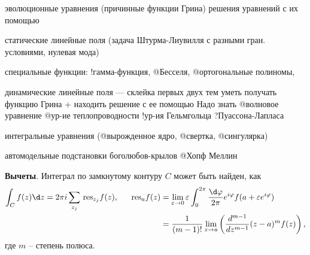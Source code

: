 эволюционные уравнения (причинные функции Грина)
решения уравнений с их помощью

статические линейные поля (задача Штурма-Лиувилля с разными гран. условиями, нулевая мода)

специальные функции: 
	!гамма-функция, 
	@Бесселя, 
	@ортогональные полиномы, 



динамические линейные поля — склейка первых двух тем 
	уметь получать функцию Грина 
	+ находить решение с ее помощью
	Надо знать 
		@волновое уравнение
		@ур-ие теплопроводности
		!ур-ия Гельмгольца
		?Пуассона-Лапласа

интегральные уравнения (@вырожденное ядро, @свертка, @сингулярка)

	автомодельные подстановки
	боголюбов-крылов
	@Хопф
	Меллин


\textbf{Вычеты}. Интеграл по замкнутому контуру $C$ может быть найден, как
\begin{align*}
    \int_C f(z) \d z = 2 \pi i \sum_{z_j} \,\text{res}_{z_j} f(z),
    \hspace{5 mm} 
    \,\text{res}_{a} f(z) &= \lim_{\varepsilon \to 0} \varepsilon \int_0^{2\pi} \frac{\d \varphi}{2\pi} e^{i \varphi} f(a + \varepsilon e^{i \varphi}) \\ 
    &= \frac{1}{(m-1)!} \lim_{z \to a} \left(
        \frac{d^{m-1} }{d z^{m-1}} (z-a)^m f(z)
    \right),
\end{align*}
где $m$ -- степень полюса. 